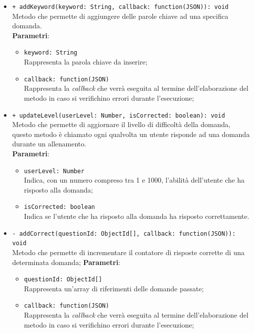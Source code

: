 \begin{itemize}
\begin{itemize}
	\item \texttt{+ addKeyword(keyword: String, callback: function(JSON)): void} \\
	Metodo che permette di aggiungere delle parole chiave ad una specifica domanda. \\
		\textbf{Parametri}:
			 \begin{itemize}
			 	\item \texttt{keyword: String} \\
			 	Rappresenta la parola chiave da inserire;
			 	\item \texttt{callback: function(JSON)} \\
			 	Rappresenta la \textit{callback} che verrà eseguita al termine dell'elaborazione del metodo in caso si verifichino errori durante l'esecuzione;
			 \end{itemize}
	\item \texttt{+ updateLevel(userLevel: Number, isCorrected: boolean): void} \\
	Metodo che permette di aggiornare il livello di difficoltà della domanda, questo metodo è chiamato ogni qualvolta un utente risponde ad una domanda durante un allenamento.\\
		\textbf{Parametri}:
			\begin{itemize}
				\item \texttt{userLevel: Number} \\
				Indica, con un numero compreso tra 1 e 1000, l'abilità dell'utente che ha risposto alla domanda;
				\item \texttt{isCorrected: boolean} \\
				Indica se l'utente che ha risposto alla domanda ha risposto correttamente.
			\end{itemize}  
	\item \texttt{- addCorrect(questionId: ObjectId[], callback: function(JSON)): void} \\
	Metodo che permette di incrementare il contatore di risposte corrette di una determinata domanda;
		\textbf{Parametri}:
			\begin{itemize}
				\item \texttt{questionId: ObjectId[]} \\
					Rappresenta un'array di riferimenti delle domande passate;
				\item \texttt{callback: function(JSON)} \\
					Rappresenta la \textit{callback} che verrà eseguita al termine dell'elaborazione del metodo in caso si verifichino errori durante l'esecuzione;

\end{itemize}
\end{itemize}
\end{itemize}
